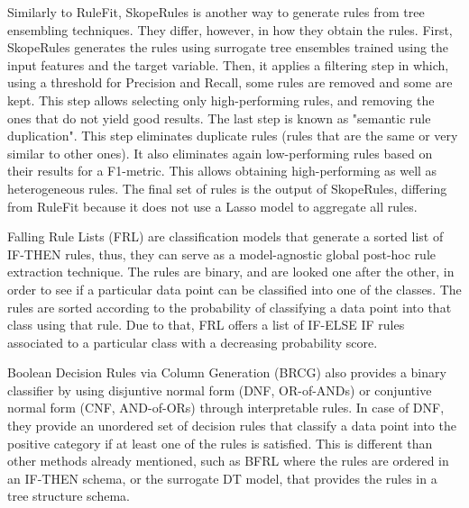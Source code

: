Similarly to RuleFit, SkopeRules \parencite{molnar2019interpretable} is another way to generate rules from tree ensembling techniques. They differ, however, in how they obtain the rules. 
First, SkopeRules generates the rules using surrogate tree ensembles trained using the input features and the target variable. Then, it applies a filtering step in which, using a threshold for Precision and Recall, some rules are removed and some are kept. This step allows selecting only high-performing rules, and removing the ones that do not yield good results. The last step is known as "semantic rule duplication". This step eliminates duplicate rules (rules that are the same or very similar to other ones). It also eliminates again low-performing rules based on their results for a F1-metric. This allows obtaining high-performing as well as heterogeneous rules. The final set of rules is the output of SkopeRules, differing from RuleFit because it does not use a Lasso model to aggregate all rules.

Falling Rule Lists (FRL) \parencite{wang2015falling} are classification models that generate a sorted list of IF-THEN rules, thus, they can serve as a model-agnostic global post-hoc rule extraction technique. The rules are binary, and are looked one after the other, in order to see if a particular data point can be classified into one of the classes. The rules are sorted according to the probability of classifying a data point into that class using that rule. Due to that, FRL offers a list of IF-ELSE IF rules associated to a particular class with a decreasing probability score. 

Boolean Decision Rules via Column Generation (BRCG) \parencite{NIPS2018_7716} also provides a binary classifier by using disjuntive normal form (DNF, OR-of-ANDs) or conjuntive normal form (CNF, AND-of-ORs) through interpretable rules. In case of DNF, they provide an unordered set of decision rules that classify a data point into the positive category if at least one of the rules is satisfied. This is different than other methods already mentioned, such as BFRL where the rules are ordered in an IF-THEN schema, or the surrogate DT model, that provides the rules in a tree structure schema.

